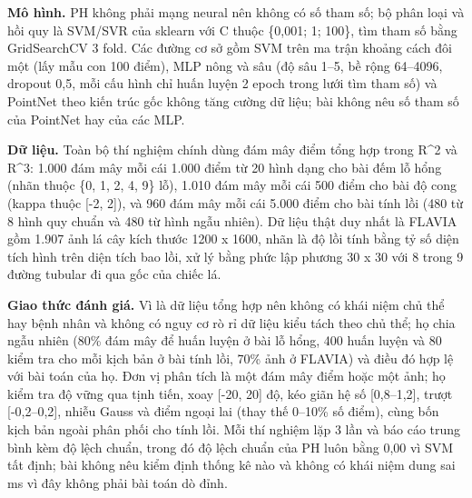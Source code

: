 \documentclass[12pt,a4paper]{article}
\begin{document}
\noindent \textbf{Mô hình.} PH không phải mạng neural nên không có số tham số; bộ phân loại và hồi quy là SVM/SVR của sklearn với C thuộc \{0,001; 1; 100\}, tìm tham số bằng GridSearchCV 3 fold. Các đường cơ sở gồm SVM trên ma trận khoảng cách đôi một (lấy mẫu con 100 điểm), MLP nông và sâu (độ sâu 1–5, bề rộng 64–4096, dropout 0,5, mỗi cấu hình chỉ huấn luyện 2 epoch trong lưới tìm tham số) và PointNet theo kiến trúc gốc không tăng cường dữ liệu; bài không nêu số tham số của PointNet hay của các MLP.\par\vspace{3pt}
\noindent \textbf{Dữ liệu.} Toàn bộ thí nghiệm chính dùng đám mây điểm tổng hợp trong R\textasciicircum{}2 và R\textasciicircum{}3: 1.000 đám mây mỗi cái 1.000 điểm từ 20 hình dạng cho bài đếm lỗ hổng (nhãn thuộc \{0, 1, 2, 4, 9\} lỗ), 1.010 đám mây mỗi cái 500 điểm cho bài độ cong (kappa thuộc [-2, 2]), và 960 đám mây mỗi cái 5.000 điểm cho bài tính lồi (480 từ 8 hình quy chuẩn và 480 từ hình ngẫu nhiên). Dữ liệu thật duy nhất là FLAVIA gồm 1.907 ảnh lá cây kích thước 1200 x 1600, nhãn là độ lồi tính bằng tỷ số diện tích hình trên diện tích bao lồi, xử lý bằng phức lập phương 30 x 30 với 8 trong 9 đường tubular đi qua gốc của chiếc lá.\par\vspace{3pt}
\noindent \textbf{Giao thức đánh giá.} Vì là dữ liệu tổng hợp nên không có khái niệm chủ thể hay bệnh nhân và không có nguy cơ rò rỉ dữ liệu kiểu tách theo chủ thể; họ chia ngẫu nhiên (80\% đám mây để huấn luyện ở bài lỗ hổng, 400 huấn luyện và 80 kiểm tra cho mỗi kịch bản ở bài tính lồi, 70\% ảnh ở FLAVIA) và điều đó hợp lệ với bài toán của họ. Đơn vị phân tích là một đám mây điểm hoặc một ảnh; họ kiểm tra độ vững qua tịnh tiến, xoay [-20, 20] độ, kéo giãn hệ số [0,8–1,2], trượt [-0,2–0,2], nhiễu Gauss và điểm ngoại lai (thay thế 0–10\% số điểm), cùng bốn kịch bản ngoài phân phối cho tính lồi. Mỗi thí nghiệm lặp 3 lần và báo cáo trung bình kèm độ lệch chuẩn, trong đó độ lệch chuẩn của PH luôn bằng 0,00 vì SVM tất định; bài không nêu kiểm định thống kê nào và không có khái niệm dung sai ms vì đây không phải bài toán dò đỉnh.\par\vspace{3pt}
\end{document}
